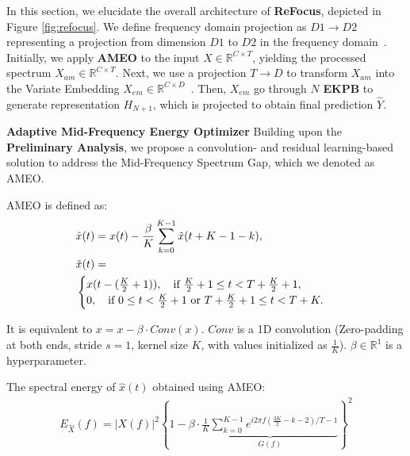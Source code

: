 In this section, we elucidate the overall architecture of \textbf{ReFocus}, depicted in Figure \ref{fig:refocus}. We define frequency domain projection as $D1\rightarrow D2$ representing a projection from dimension $D1$ to $D2$ in the frequency domain~\citep{xu2024fits}. Initially, we apply \textbf{AMEO} to the input $X \in \mathbb{R}^{C \times T}$, yielding the processed spectrum $ X_{am} \in \mathbb{R}^{C  \times T} $. Next, we use a projection $T\rightarrow D$ to transform $ X_{am}$ into the Variate Embedding $ X_{em} \in \mathbb{R}^{C  \times D}$~\citep{LiuiTransformer}. Then, $X_{em}$ go through $N$ \textbf{EKPB} to generate representation $H_{N+1}$, which is projected to obtain final prediction $\hat{Y}$. 

\textbf{Adaptive Mid-Frequency Energy Optimizer \quad}
Building upon the \textbf{Preliminary Analysis}, we propose a convolution- and residual learning-based solution to address the Mid-Frequency Spectrum Gap, which we denoted as AMEO. 
\begin{definition}\label{def:AMEO}
AMEO is defined as:
\begin{align}
&\hat{x}(t) = x(t)-\frac{\beta}{K}\sum_{k=0}^{K-1} \tilde{x}(t+K-1-k),\notag\\
&\tilde{x}(t) =\notag\\
&\begin{cases}
x(t-(\frac{K}{2}+1)), \quad \text{if } \frac{K}{2}+1 \leq t < T+\frac{K}{2}+1, \\
0,  \quad\text{if } 0 \leq t < \frac{K}{2}+1 \text{ or } T+\frac{K}{2}+1 \leq t < T+K.
\end{cases}
\end{align}
\vspace{-0.2cm}
\end{definition}

It is equivalent to $x=x-\beta \cdot Conv(x)$. $Conv$ is a 1D convolution (Zero-padding at both ends, stride $s=1$, kernel size $K$, with values initialized as $ \frac{1}{K} $). $\beta \in \mathbb{R}^{1}$ is a hyperparameter.

\begin{theorem}  \label{theorem:AMEO}
The spectral energy of $\hat{x}(t)$ obtained using AMEO:
\begin{align}
E_{\hat{X}}(f) =|X(f)|^2 \left\{1 - \beta \cdot \underbrace{\frac{1}{K} \sum_{k=0}^{K-1} e^{i 2 \pi f (\frac{3K}{2}-k -2) / {T-1}}}_{G(f)}\right\}^2
\end{align}
\vspace{-0.2cm}
\end{theorem}


